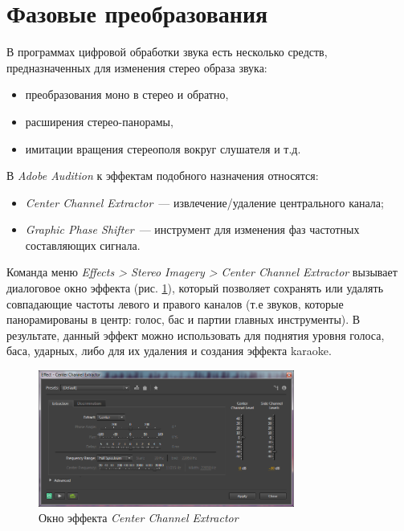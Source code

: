 \documentclass[oneside, final, 14pt]{extreport}
\begin{document}
\section{Фазовые преобразования}
В программах цифровой обработки звука есть несколько средств, предназначенных для изменения стерео образа звука:
\begin{itemize}
  \item преобразования моно в стерео и обратно,
  \item расширения стерео-панорамы,
  \item имитации вращения стереополя вокруг слушателя и т.д.
\end{itemize}

В \textit{Adobe Audition} к эффектам подобного назначения относятся:
\begin{itemize}
  \item \textit{Center Channel Extractor}~--- извлечение/удаление центрального канала;
  \item \textit{Graphic Phase Shifter}~--- инструмент для изменения фаз частотных составляющих сигнала.
\end{itemize}

Команда меню \textit{Effects > Stereo Imagery > Center Channel Extractor} вызывает диалоговое окно эффекта (рис. \ref{pic-aucenterchannel-01}), который позволяет сохранять или удалять совпадающие частоты левого и правого каналов (т.е звуков, которые панорамированы в центр: голос, бас и партии главных инструменты). В результате, данный эффект можно использовать для поднятия уровня голоса, баса, ударных, либо для их удаления и создания эффекта karaoke.

\begin{figure}[h!]
  \centering
  \includegraphics[width=0.75\textwidth]{pic-aucenterchannel-01}
  \caption{Окно эффекта \emph{Center Channel Extractor}}
  \label{pic-aucenterchannel-01}
\end{figure}
\end{document}
